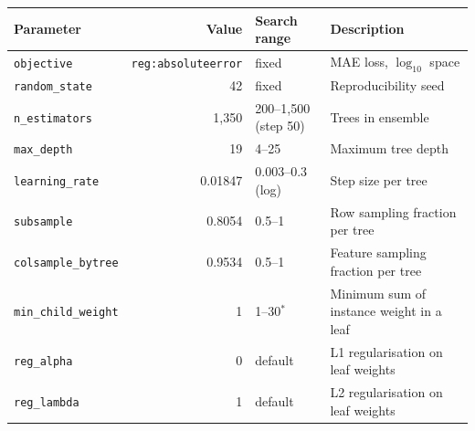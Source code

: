 \begin{tabular}{lrlp{5.2cm}}
\toprule
Parameter & Value & Search range & Description \\
\midrule
\texttt{objective} & \texttt{reg:absoluteerror} & fixed & MAE loss, $\log_{10}$ space \\
\texttt{random\_state} & 42 & fixed & Reproducibility seed \\
\texttt{n\_estimators} & 1{,}350 & 200--1{,}500 (step 50) & Trees in ensemble \\
\texttt{max\_depth} & 19 & 4--25 & Maximum tree depth \\
\texttt{learning\_rate} & 0.01847 & 0.003--0.3 (log) & Step size per tree \\
\texttt{subsample} & 0.8054 & 0.5--1 & Row sampling fraction per tree \\
\texttt{colsample\_bytree} & 0.9534 & 0.5--1 & Feature sampling fraction per tree \\
\texttt{min\_child\_weight} & 1 & 1--30$^{*}$ & Minimum sum of instance weight in a leaf \\
\texttt{reg\_alpha} & 0 & default & L1 regularisation on leaf weights \\
\texttt{reg\_lambda} & 1 & default & L2 regularisation on leaf weights \\
\bottomrule
\end{tabular}
